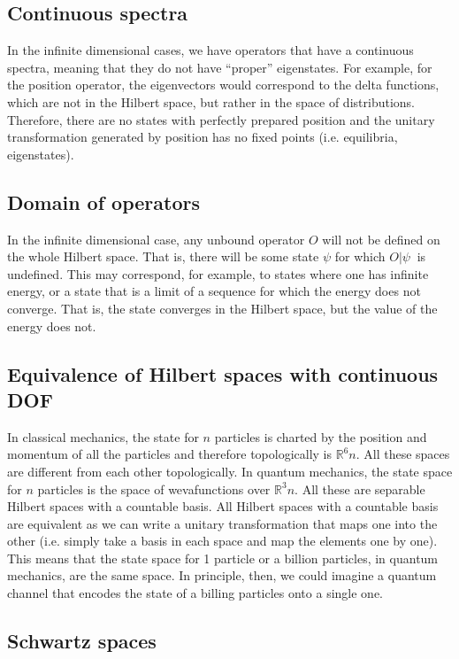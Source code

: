 \subsection{Continuous spectra}

In the infinite dimensional cases, we have operators that have a continuous spectra, meaning that they do not have ``proper'' eigenstates. For example, for the position operator, the eigenvectors would correspond to the delta functions, which are not in the Hilbert space, but rather in the space of distributions. Therefore, there are no states with perfectly prepared position and the unitary transformation generated by position has no fixed points (i.e. equilibria, eigenstates).

\subsection{Domain of operators}

In the infinite dimensional case, any unbound operator $O$ will not be defined on the whole Hilbert space. That is, there will be some state $\psi$ for which $O |\psi\>$ is undefined. This may correspond, for example, to states where one has infinite energy, or a state that is a limit of a sequence for which the energy does not converge. That is, the state converges in the Hilbert space, but the value of the energy does not.

\subsection{Equivalence of Hilbert spaces with continuous DOF}

In classical mechanics, the state for $n$ particles is charted by the position and momentum of all the particles and therefore topologically is $\mathbb{R}^6n$. All these spaces are different from each other topologically. In quantum mechanics, the state space for $n$ particles is the space of wevafunctions over $\mathbb{R}^3n$. All these are separable Hilbert spaces with a countable basis. All Hilbert spaces with a countable basis are equivalent as we can write a unitary transformation that maps one into the other (i.e. simply take a basis in each space and map the elements one by one). This means that the state space for 1 particle or a billion particles, in quantum mechanics, are the same space. In principle, then, we could imagine a quantum channel that encodes the state of a billing particles onto a single one.

\subsection{Schwartz spaces}

